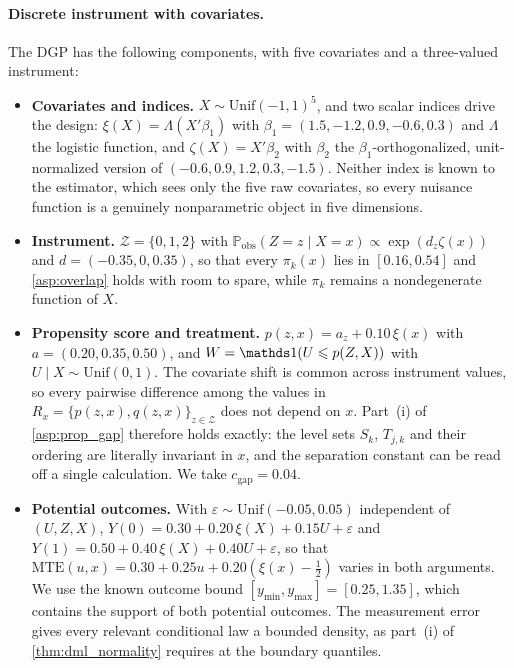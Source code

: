 \paragraph{Discrete instrument with covariates.}
The DGP has the following components, with five covariates and a three-valued instrument:
\begin{itemize}
    \item \textbf{Covariates and indices.} $X\sim\text{Unif}(-1,1)^5$, and two scalar indices drive the design: $\xi(X)=\Lambda(X'\beta_1)$ with $\beta_1=(1.5,-1.2,0.9,-0.6,0.3)$ and $\Lambda$ the logistic function, and $\zeta(X)=X'\beta_2$ with $\beta_2$ the $\beta_1$-orthogonalized, unit-normalized version of $(-0.6,0.9,1.2,0.3,-1.5)$. Neither index is known to the estimator, which sees only the five raw covariates, so every nuisance function is a genuinely nonparametric object in five dimensions.

    \item \textbf{Instrument.} $\mathcal Z=\{0,1,2\}$ with $\mathbb P_{\text{obs}}(Z=z\mid X=x)\propto\exp(d_z\zeta(x))$ and $d=(-0.35,0,0.35)$, so that every $\pi_k(x)$ lies in $[0.16,0.54]$ and \cref{asp:overlap} holds with room to spare, while $\pi_k$ remains a nondegenerate function of $X$.

    \item \textbf{Propensity score and treatment.} $p(z,x)=a_z+0.10\,\xi(x)$ with $a=(0.20,0.35,0.50)$, and $W=\indicator(U\leqslant p(Z,X))$ with $U\mid X\sim\text{Unif}(0,1)$. The covariate shift is common across instrument values, so every pairwise difference among the values in $R_x=\{p(z,x),q(z,x)\}_{z\in\mathcal Z}$ does not depend on $x$. Part~\textup{(i)} of \cref{asp:prop_gap} therefore holds exactly: the level sets $S_k$, $T_{j,k}$ and their ordering are literally invariant in $x$, and the separation constant can be read off a single calculation. We take $c_{\text{gap}}=0.04$.

    \item \textbf{Potential outcomes.} With $\varepsilon\sim\text{Unif}(-0.05,0.05)$ independent of $(U,Z,X)$, $Y(0)=0.30+0.20\,\xi(X)+0.15U+\varepsilon$ and $Y(1)=0.50+0.40\,\xi(X)+0.40U+\varepsilon$, so that $\text{MTE}(u,x)=0.30+0.25u+0.20(\xi(x)-\tfrac12)$ varies in both arguments. We use the known outcome bound $[y_{\min},y_{\max}]=[0.25,1.35]$, which contains the support of both potential outcomes. The measurement error gives every relevant conditional law a bounded density, as part~\textup{(i)} of \cref{thm:dml_normality} requires at the boundary quantiles.
\end{itemize}

